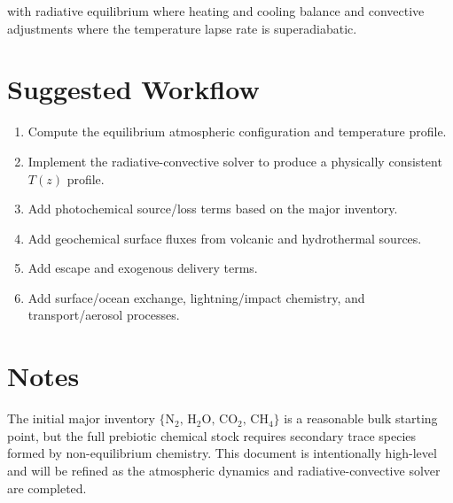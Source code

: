 \documentclass[11pt]{article}
\begin{document}
with radiative equilibrium where heating and cooling balance and convective adjustments where the temperature lapse rate is superadiabatic.

\section{Suggested Workflow}

\begin{enumerate}
  \item Compute the equilibrium atmospheric configuration and temperature profile.
  \item Implement the radiative-convective solver to produce a physically consistent $T(z)$ profile.
  \item Add photochemical source/loss terms based on the major inventory.
  \item Add geochemical surface fluxes from volcanic and hydrothermal sources.
  \item Add escape and exogenous delivery terms.
  \item Add surface/ocean exchange, lightning/impact chemistry, and transport/aerosol processes.
\end{enumerate}

\section{Notes}

The initial major inventory $\{\mathrm{N_2},\,\mathrm{H_2O},\,\mathrm{CO_2},\,\mathrm{CH_4}\}$ is a reasonable bulk starting point, but the full prebiotic chemical stock requires secondary trace species formed by non-equilibrium chemistry. This document is intentionally high-level and will be refined as the atmospheric dynamics and radiative-convective solver are completed.
\end{document}
